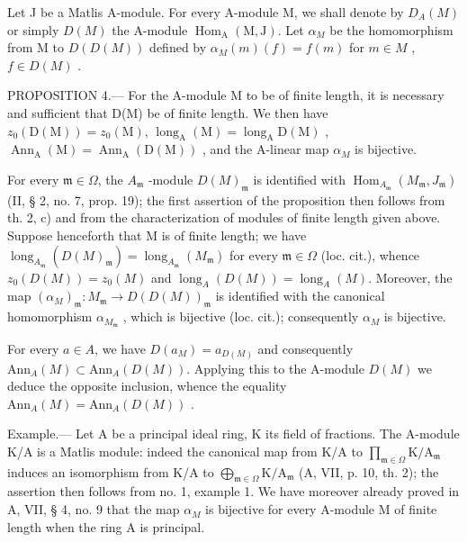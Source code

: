 Let J be a Matlis A-module. For every A-module M, we shall denote by \(D_{A}(M)\) or simply \(D(M)\) the A-module \(\operatorname{Hom}_{\mathrm{A}}(\mathrm{M},\mathrm{J})\). Let \(\alpha_{M}\) be the homomorphism from M to \(D(D(M))\) defined by \(\alpha_{M}(m)(f)=f(m)\) for \(m\in M\) , \(f\in D(M)\) .

PROPOSITION 4.--- For the A-module M to be of finite length, it is necessary and sufficient that D(M) be of finite length. We then have \(z_{0}(\mathrm{D}(\mathrm{M})) = z_{0}(\mathrm{M})\), \(\operatorname{long}_{\mathrm{A}}(\mathrm{M}) = \operatorname{long}_{\mathrm{A}}\mathrm{D}(\mathrm{M})\) , \(\operatorname{Ann}_{\mathrm{A}}(\mathrm{M}) = \operatorname{Ann}_{\mathrm{A}}(\mathrm{D}(\mathrm{M}))\) , and the A-linear map \(\alpha_{M}\) is bijective.

For every \(\mathfrak{m} \in \Omega\), the \(A_{\mathfrak{m}}\) -module \(D(M)_{\mathfrak{m}}\) is identified with \(\operatorname{Hom}_{A_{\mathfrak{m}}} (M_{\mathfrak{m}}, J_{\mathfrak{m}})\) (II, § 2, no. 7, prop. 19); the first assertion of the proposition then follows from th. 2, c) and from the characterization of modules of finite length given above. Suppose henceforth that M is of finite length; we have \(\operatorname{long}_{A_{\mathfrak{m}}} (D(M)_{\mathfrak{m}}) = \operatorname{long}_{A_{\mathfrak{m}}} (M_{\mathfrak{m}})\) for every \(\mathfrak{m} \in \Omega\) (loc. cit.), whence \(z_0(D(M)) = z_0(M)\) and \(\operatorname{long}_A(D(M)) = \operatorname{long}_A(M)\). Moreover, the map \((\alpha_{M})_{\mathfrak{m}}: M_{\mathfrak{m}} \to D(D(M))_{\mathfrak{m}}\) is identified with the canonical homomorphism \(\alpha_{M_{\mathfrak{m}}}\) , which is bijective (loc. cit.); consequently \(\alpha_{M}\) is bijective.

For every \(a \in A\), we have \(D(a_{M}) = a_{D(M)}\) and consequently \(\text{Ann}_{A}(M) \subset \text{Ann}_{A}(D(M))\). Applying this to the A-module \(D(M)\) we deduce the opposite inclusion, whence the equality \(\text{Ann}_{A}(M) = \text{Ann}_{A}(D(M))\) .

Example.--- Let A be a principal ideal ring, K its field of fractions. The A-module K/A is a Matlis module: indeed the canonical map from K/A to \(\prod_{\mathfrak{m}\in\Omega}\mathrm{K}/\mathrm{A}_{\mathfrak{m}}\) induces an isomorphism from K/A to \(\bigoplus_{\mathfrak{m}\in\Omega}\mathrm{K}/\mathrm{A}_{\mathfrak{m}}\) (A, VII, p. 10, th. 2); the assertion then follows from no. 1, example 1. We have moreover already proved in A, VII, § 4, no. 9 that the map \(\alpha_{M}\) is bijective for every A-module M of finite length when the ring A is principal.

